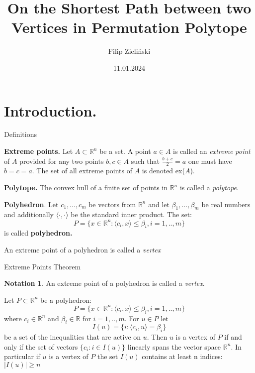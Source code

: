 \documentclass{beamer}
\author{Filip Zieliński}
\institute{
UKEN Kraków
}
\date{11.01.2024}
\title{On the Shortest Path between two Vertices in Permutation Polytope }
\theoremstyle{plain}
\theoremstyle{definition}
\newtheorem*{notation}{Notation}
\begin{document}
\titlepage
\newpage
\section{Introduction.}
\begin{frame}{Definitions}
    \begin{definition}\label{def Extreme Points}
    \textbf{Extreme points.} Let $A \subset \mathbb{R}^n $ be a set. A point $a \in A$ is called an \textit{extreme point} of $A$ provided for any two points $b,c \in A$  such that $\frac{b+c}{2} = a$ one must have $b = c = a$. The set of all extreme points of $A$ is denoted ex($A$).  
    \end{definition}
    \pause 
    \begin{definition} \label{def2}
    \textbf{Polytope.} The convex hull of a finite set of points in $ \mathbb{R}^n$ is called a \textit{polytope}.
    \end{definition}
    \begin{definition}
         \textbf{Polyhedron}. Let $c_{1},..., c_{m}$ be vectors from $ \mathbb{R}^n$ and let $\beta_{1}, ... , \beta_{m}$ be real numbers and additionally $\langle \cdot,\cdot \rangle$ be  the standard inner product. The set:
    $$P = \{ x \in \mathbb{R}^n : \langle c_{i},x \rangle \leq \beta_{i},  i=1,..,m\}$$
    is called \textbf{polyhedron.}
    \end{definition}
    An extreme point of a polyhedron is called a \textit{vertex}
   
\end{frame}
\begin{frame}{Extreme Points Theorem}
    \begin{notation}
    An extreme point of a polyhedron is called a \textit{vertex}.
\end{notation}
\begin{Theorem}
    Let $P \subset \mathbb{R}^n$ be a polyhedron:
    $$P = \{ x \in \mathbb{R}^n : \langle c_{i},x \rangle \leq \beta_{i},  i=1,..,m\}$$
    where $c_i \in \mathbb{R}^n$ and $\beta_i \in \mathbb{R}$ for $i=1,..,m$.
    For $u \in P$ let
    $$I(u) = \{i:\langle c_{i},u \rangle  = \beta_i \}$$
    be a set of the inequalities that are active on $u$. Then $u$ is a vertex of $P$ if and only if the set of vectors $\{c_i : i \in I(u) \}$ linearly spans the vector space $\mathbb{R}^n$. In particular if $u$ is a vertex of $P$ the set $I(u)$ contains at least n indices: $|I(u)| \geq n$

\end{Theorem}
\end{frame}
\end{document}
